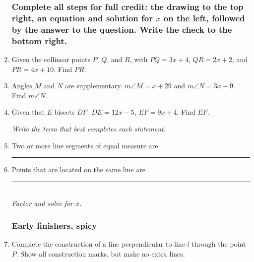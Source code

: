 \documentclass[12pt, twoside]{article}
\begin{document}
\begin{enumerate}
\newpage
\subsubsection*{Complete all steps for full credit: the drawing to the top right, an equation and solution for $x$ on the left, followed by the answer to the question. Write the check to the bottom right.}

  \item Given the collinear points $P$, $Q$, and $R$, with $PQ=3x+4$, $QR=2x+2$, and $PR=4x+10$. Find ${PR}$.
  \vspace{9cm}

  \item Angles $M$ and $N$ are supplementary. $m\angle M = x+29$ and $m\angle N = 3x-9$. Find $m\angle N$. \vspace{7cm}


\newpage

  \item Given that $E$ bisects $\overline{DF}$. $DE=12x-5$, $EF=9x+4$. Find ${EF}$.
  \vspace{9cm}

  \emph{Write the term that best completes each statement.}
  \item Two or more line segments of equal measure are \rule{4cm}{0.15mm} \bigskip

  \item Points that are located on the same line are \rule{4cm}{0.15mm} \\[15pt]

  \emph{Factor and solve for $x$.}
  
\newpage

  \subsubsection*{Early finishers, spicy}

  \item Complete the construction of a line perpendicular to line $l$ through the point $P$. Show all construction marks, but make no extra lines. \vspace{2cm}
  \begin{center}
  \end{center} \vspace{6cm}


\end{enumerate}
\end{document}

